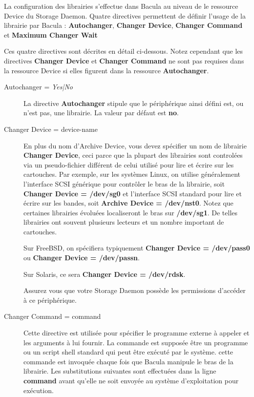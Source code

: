 La configuration des librairies s'effectue dans Bacula au niveau de le ressource 
Device du Storage Daemon. Quatre directives permettent de d\'efinir l'usage de 
la librairie par Bacula : {\bf Autochanger}, {\bf Changer Device},
{\bf Changer Command} et {\bf Maximum Changer Wait} 

Ces quatre directives sont d\'ecrites en d\'etail ci-dessous. Notez cependant 
que les directives {\bf Changer Device} et {\bf Changer Command} ne sont pas 
requises dans la ressource Device si elles figurent dans la ressource 
{\bf Autochanger}.

\begin{description}

\item [Autochanger = {\it Yes|No} ]
   La directive {\bf Autochanger} stipule que le p\'eriph\'erique ainsi d\'efini est, ou 
   n'est pas, une librairie. La valeur par d\'efaut est {\bf no}.

\item [Changer Device = \lt{}device-name\gt{}]
   En plus du nom d'Archive Device, vous devez sp\'ecifier un nom de 
   librairie {\bf Changer Device}, ceci parce que la plupart des librairies 
   sont control\'ees via un pseudo-fichier diff\'erent de celui utilis\'e pour 
   lire et \'ecrire sur les cartouches. Par exemple, sur les syst\`emes Linux, 
   on utilise g\'en\'eralement l'interface SCSI g\'en\'erique pour contr\^oler le bras 
   de la librairie, soit {\bf Changer Device = /dev/sg0} et l'interface SCSI 
   standard pour lire et \'ecrire sur les bandes, soit {\bf Archive Device = /dev/nst0}.
   Notez que certaines librairies \'evolu\'ees localiseront le bras sur 
   {\bf /dev/sg1}. De telles librairies ont souvent plusieurs lecteurs et un 
   nombre important de cartouches.

   Sur FreeBSD, on sp\'ecifiera typiquement {\bf Changer Device = /dev/pass0} ou 
   {\bf Changer Device = /dev/passn}.

   Sur Solaris, ce sera {\bf Changer Device = /dev/rdsk}.

   Assurez vous que votre Storage Daemon poss\`ede les permissions d'acc\'eder \`a 
   ce p\'eriph\'erique.

\item [Changer Command = \lt{}command\gt{}]
   Cette directive est utilis\'ee pour sp\'ecifier le programme externe \`a appeler 
   et les arguments \`a lui fournir. La commande est suppos\'ee \^etre un programme 
   ou un script shell standard qui peut \^etre ex\'ecut\'e par le syst\`eme. cette 
   commande est invoqu\'ee chaque fois que Bacula manipule le bras de la librairie. 
   Les substitutions suivantes sont effectu\'ees dans la ligne {\bf command} 
   avant qu'elle ne soit envoy\'ee au syst\`eme d'exploitation pour ex\'ecution.


\end{description}
